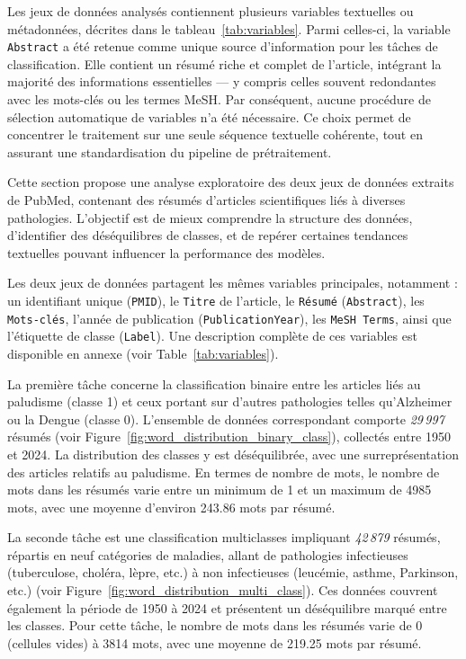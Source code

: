 \documentclass[12pt]{report}
\begin{document}
Les jeux de données analysés contiennent plusieurs variables textuelles ou métadonnées, décrites dans le tableau~\ref{tab:variables}. Parmi celles-ci, la variable \texttt{Abstract} a été retenue comme unique source d'information pour les tâches de classification. Elle contient un résumé riche et complet de l’article, intégrant la majorité des informations essentielles — y compris celles souvent redondantes avec les mots-clés ou les termes MeSH. Par conséquent, aucune procédure de sélection automatique de variables n’a été nécessaire. Ce choix permet de concentrer le traitement sur une seule séquence textuelle cohérente, tout en assurant une standardisation du pipeline de prétraitement.

Cette section propose une analyse exploratoire des deux jeux de données extraits de PubMed, contenant des résumés d’articles scientifiques liés à diverses pathologies. L’objectif est de mieux comprendre la structure des données, d’identifier des déséquilibres de classes, et de repérer certaines tendances textuelles pouvant influencer la performance des modèles.

Les deux jeux de données partagent les mêmes variables principales, notamment : un identifiant unique (\texttt{PMID}), le \texttt{Titre} de l’article, le \texttt{Résumé} (\texttt{Abstract}), les \texttt{Mots-clés}, l’année de publication (\texttt{PublicationYear}), les \texttt{MeSH Terms}, ainsi que l’étiquette de classe (\texttt{Label}). Une description complète de ces variables est disponible en annexe (voir Table~\ref{tab:variables}).

La première tâche concerne la classification binaire entre les articles liés au paludisme (classe 1) et ceux portant sur d’autres pathologies telles qu’Alzheimer ou la Dengue (classe 0). L’ensemble de données correspondant comporte \textit{29\,997} résumés (voir Figure~\ref{fig:word_distribution_binary_class}), collectés entre 1950 et 2024. La distribution des classes y est déséquilibrée, avec une surreprésentation des articles relatifs au paludisme. En termes de nombre de mots, le nombre de mots dans les résumés varie entre un minimum de 1 et un maximum de 4985 mots, avec une moyenne d’environ 243.86 mots par résumé.

La seconde tâche est une classification multiclasses impliquant \textit{42\,879} résumés, répartis en neuf catégories de maladies, allant de pathologies infectieuses (tuberculose, choléra, lèpre, etc.) à non infectieuses (leucémie, asthme, Parkinson, etc.) (voir Figure~\ref{fig:word_distribution_multi_class}). Ces données couvrent également la période de 1950 à 2024 et présentent un déséquilibre marqué entre les classes. Pour cette tâche, le nombre de mots dans les résumés varie de 0 (cellules vides) à 3814 mots, avec une moyenne de 219.25 mots par résumé.
\end{document}
